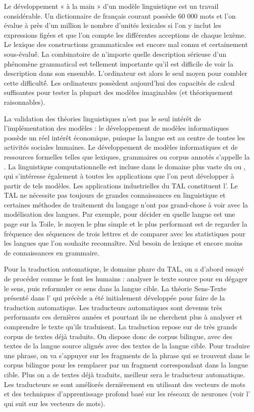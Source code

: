 Le développement « à la main » d’un modèle linguistique est un travail considérable. Un dictionnaire de français courant possède 60 000 mots et l’on évalue à près d’un million le nombre d’unités lexicales si l’on y inclut les expressions figées et que l’on compte les différentes acceptions de chaque lexème. Le lexique des constructions grammaticales est encore mal connu et certainement sous-évalué́. La combinatoire de n’importe quelle description sérieuse d’un phénomène grammatical est tellement importante qu’il est difficile de voir la description dans son ensemble. L’ordinateur est alors le seul moyen pour combler cette difficulté́. Les ordinateurs possèdent aujourd’hui des capacités de calcul suffisantes pour tester la plupart des modèles imaginables (et théoriquement raisonnables). 

La validation des théories linguistiques n’est pas le seul intérêt de l’implémentation des modèles : le développement de modèles informatiques possède un réel intérêt économique, puisque la langue est au centre de toutes les activités sociales humaines. Le développement de modèles informatiques et de ressources formelles telles que lexiques, grammaires ou corpus annotés s’appelle la . La linguistique computationnelle est incluse dans le domaine plus vaste du  ou , qui s’intéresse également à toutes les applications que l’on peut développer à partir de tels modèles. Les applications industrielles du TAL constituent l’. 
Le TAL ne nécessite pas toujours de grandes connaissances en linguistique et certaines méthodes de traitement du langage n’ont pas grand-chose à voir avec la modélisation des langues. Par exemple, pour décider en quelle langue est une page sur la Toile, le moyen le plus simple et le plus performant est de regarder la fréquence des séquences de trois lettres et de comparer avec les statistiques pour les langues que l’on souhaite reconnaître. Nul besoin de lexique et encore moins de connaissances en grammaire. 

Pour la traduction automatique, le domaine phare du TAL, on a d’abord essayé de procéder comme le font les humains : analyser le texte source pour en dégager le sens, puis reformuler ce sens dans la langue cible. La théorie Sens-Texte présenté dans l’ qui précède a été initialement développée pour faire de la traduction automatique. Les traducteurs automatiques sont devenus très performants ces dernières années et pourtant ils ne cherchent plus à analyser et comprendre le texte qu’ils traduisent. La traduction repose sur de très grands corpus de textes déjà traduits. On dispose donc de corpus bilingue, avec des textes de la langue source alignés avec des textes de la langue cible. Pour traduire une phrase, on va s’appuyer sur les fragments de la phrase qui se trouvent dans le corpus bilingue pour les remplacer par un fragment correspondant dans la langue cible. Plus on a de textes déjà traduits, meilleur sera le traducteur automatique. Les traducteurs se sont améliorés dernièrement en utilisant des vecteurs de mots et des techniques d’apprentissage profond basé sur les réseaux de neurones (voir l’ qui suit sur les vecteurs de mots).

